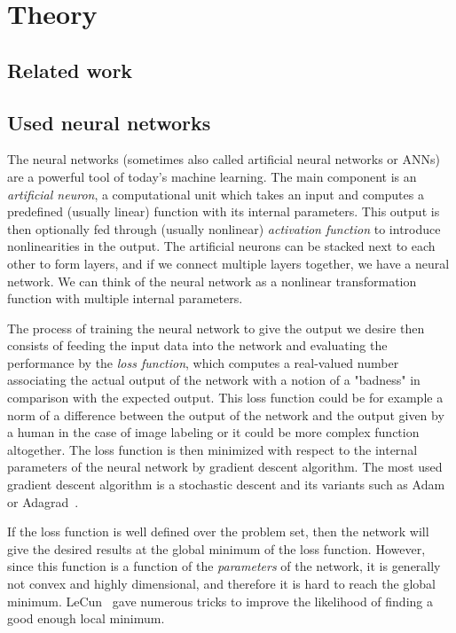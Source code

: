 \chapter{Theory}

\section{Related work}

\section{Used neural networks} \label{nets}

The neural networks (sometimes also called artificial neural networks or ANNs) are a powerful tool of today's machine learning. The main component is an {\em artificial neuron}, a computational unit which takes an input and computes a predefined (usually linear) function with its internal parameters. This output is then optionally fed through (usually nonlinear) {\em activation function} to introduce nonlinearities in the output. The artificial neurons can be stacked next to each other to form layers, and if we connect multiple layers together, we have a neural network. We can think of the neural network as a nonlinear transformation function with multiple internal parameters.

The process of training the neural network to give the output we desire then consists of feeding the input data into the network and evaluating the performance by the {\em loss function}, which computes a real-valued number associating the actual output of the network with a notion of a "badness" in comparison with the expected output. This loss function could be for example a norm of a difference between the output of the network and the output given by a human in the case of image labeling or it could be more complex function altogether. The loss function is then minimized with respect to the internal parameters of the neural network by gradient descent algorithm. The most used gradient descent algorithm is a stochastic descent and its variants such as Adam~\cite{adam} or Adagrad~\cite{adagrad}.

If the loss function is well defined over the problem set, then the network will give the desired results at the global minimum of the loss function. However, since this function is a function of the {\em parameters} of the network, it is generally not convex and highly dimensional, and therefore it is hard to reach the global minimum. LeCun~\cite{efbackprop} gave numerous tricks to improve the likelihood of finding a good enough local minimum.


